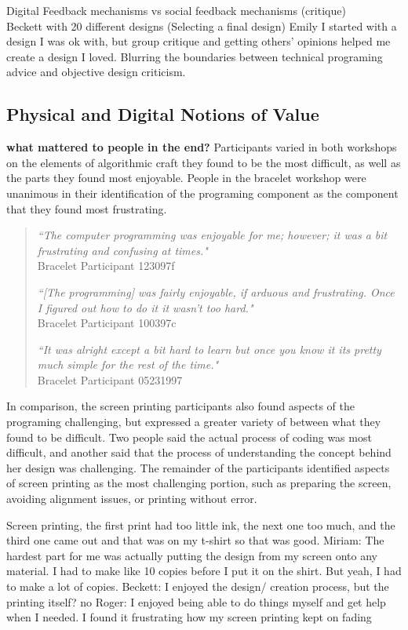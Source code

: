 \documentclass{sigchi}
\begin{document}
Digital Feedback mechanisms vs social feedback mechanisms (critique)\\
Beckett with 20 different designs (Selecting a final design)
Emily I started with a design I was ok with, but group critique and getting others' opinions helped me create a design I loved.
Blurring the boundaries between technical programing advice and objective design criticism.

\subsection{Physical and Digital Notions of Value}
\textbf{what mattered to people in the end?}
Participants varied in both workshops on the elements of algorithmic craft they found to be the most difficult, as well as the parts they found most enjoyable. People in the bracelet workshop were unanimous in their identification of the programing component as the component that they found most frustrating.
 \begin{quotation}
\textit{``The computer programming was enjoyable for me; however; it was a bit frustrating and confusing at times."}
\\Bracelet Participant 123097f

\textit{``[The programming] was fairly enjoyable, if arduous and frustrating. Once I figured out how to do it it wasn't too hard."}
\\Bracelet Participant 100397c

\textit{``It was alright except a bit hard to learn but once you know it its pretty much simple for the rest of the time."}
\\Bracelet Participant 05231997
\end{quotation}
In comparison, the screen printing participants also found aspects of the programing challenging, but expressed a greater variety of between what they found to be difficult. Two people said the actual process of coding was most difficult, and another said that the process of understanding the concept behind her design was challenging. The remainder of the participants identified aspects of screen printing as the most challenging portion, such as preparing the screen, avoiding alignment issues, or printing without error.

Screen printing, the first print had too little ink, the next one too much, and the third one came out and that was on my t-shirt so that was good.
Miriam: The hardest part for me was actually putting the design from my screen onto any material. I had to make like 10 copies before I put it on the shirt. But yeah, I had to make a lot of copies. 
Beckett: I enjoyed the design/ creation process, but the printing itself? no
Roger: I enjoyed being able to do things myself and get help when I needed. I found it frustrating how my screen printing kept on fading
\end{document}

